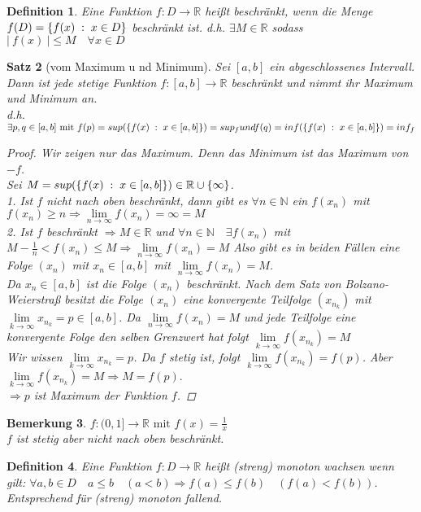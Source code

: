 \documentclass[a4paper,titlepage,oneside]{article}
\def\N{\ensuremath{\mathbb{N}} }
\def\R{\ensuremath{\mathbb{R}} }
\def\sp{\hspace{0,1cm}}
\renewcommand{\liminf}[2][n]{\ensuremath{\lim\limits_{#1 \rightarrow \infty}{#2}}}
\newcommand{\abs}[1]{\ensuremath{\left|\:#1\:\right|}}
\newcommand{\menge}[2]{\ensuremath{\{#1\sp : \sp #2\}}}
\theoremstyle{thmstyle}
\newtheorem{satz}{Satz}[subsection]
\newtheorem{defi}[satz]{Definition}
\newtheorem{bem}[satz]{Bemerkung}
\begin{document}
\begin{defi}
Eine Funktion $f: D \to \R$ heißt beschränkt, wenn die Menge $f(D) = \menge{f(x)}{x \in D}$ beschränkt ist.
d.h. $\exists M \in \R$ sodass $\abs{f(x)} \le M \quad \forall x\in D$
\end{defi}

\begin{satz}[vom Maximum u nd Minimum]
Sei $[a,b]$ ein abgeschlossenes Intervall. Dann ist jede stetige Funktion $f: [a,b] \to \R$ beschränkt und nimmt ihr Maximum und Minimum an.\\
d.h. $\exists p,q \in [a,b] \text{ mit } f(p) = sup(\menge{f(x)}{x\in[a,b]}) = sup_f und f(q) = inf(\menge{f(x)}{x\in[a,b]}) = inf_f$
\begin{proof}
Wir zeigen nur das Maximum. Denn das Minimum ist das Maximum von $-f$. \\
Sei $M = sup(\menge{f(x)}{x\in[a,b]}) \in \R \cup \{\infty\}$.\\
1. Ist $f$ nicht nach oben beschränkt, dann gibt es $\forall n \in \N$ ein $f(x_n)$ mit $f(x_n) \ge n \Rightarrow \liminf{f(x_n)} = \infty = M$\\
2. Ist $f$ beschränkt $\Rightarrow M \in \R$ und $\forall n \in \N \quad \exists f(x_n)$ mit $ M-\frac{1}{n} < f(x_n) \le M \Rightarrow \liminf{f(x_n)} = M$
Also gibt es in beiden Fällen eine Folge $(x_n)$ mit $x_n \in [a,b]$ mit $\liminf{f(x_n)} = M$.\\
Da $x_n \in [a,b]$ ist die Folge $(x_n)$ beschränkt. Nach dem Satz von Bolzano-Weierstraß besitzt die Folge $(x_n)$ eine konvergente Teilfolge $(x_{n_k})$ mit $\liminf[k]{x_{n_k}} = p \in [a,b]$.
Da $\liminf{f(x_n)} = M$ und jede Teilfolge eine konvergente Folge den selben Grenzwert hat folgt $\liminf[k]{f(x_{n_k})} = M$\\
Wir wissen $\liminf[k]{x_{n_k}} = p$. Da $f$ stetig ist, folgt $\liminf[k]{f(x_{n_k})} = f(p)$. Aber $\liminf[k]{f(x_{n_k})} = M \Rightarrow M = f(p).$\\
$\Rightarrow p$ ist Maximum der Funktion $f$.
\end{proof}
\end{satz}

\begin{bem}
$f:(0,1] \to \R \text{ mit } f(x) = \frac{1}{x}$ \\ %
$f$ ist stetig aber nicht nach oben beschränkt.
\end{bem}

\begin{defi}
Eine Funktion $f: D \to \R$ heißt (streng) monoton wachsen wenn gilt: $\forall a,b \in D \quad a \le b \quad (a < b) \Rightarrow f(a) \le f(b) \quad (f(a) < f(b))$. Entsprechend für (streng) monoton fallend.
\end{defi}
\end{document}
